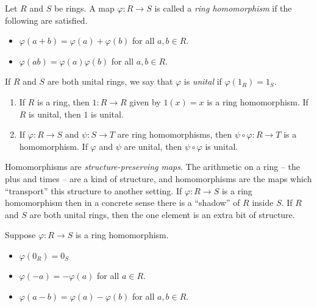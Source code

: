 \documentclass{article}
\begin{document}

\begin{dfn}
Let $R$ and $S$ be rings. A map $\varphi : R \rightarrow S$ is called a \emph{ring homomorphism} if the following are satisfied.
\begin{itemize}
\item $\varphi(a + b) = \varphi(a) + \varphi(b)$ for all $a,b \in R$.
\item $\varphi(ab) = \varphi(a)\varphi(b)$ for all $a,b \in R$.
\end{itemize}

If $R$ and $S$ are both unital rings, we say that $\varphi$ is \emph{unital} if $\varphi(1_R) = 1_S$.
\end{dfn}

\begin{prop} \mbox{}
\begin{enumerate}
\item If $R$ is a ring, then $1 : R \rightarrow R$ given by $1(x) = x$ is a ring homomorphism. If $R$ is unital, then $1$ is unital.
\item If $\varphi : R \rightarrow S$ and $\psi : S \rightarrow T$ are ring homomorphisms, then $\psi \circ \varphi : R \rightarrow T$ is a homomorphism. If $\varphi$ and $\psi$ are unital, then $\psi \circ \varphi$ is unital.
\end{enumerate}
\end{prop}

Homomorphisms are \emph{structure-preserving maps}. The arithmetic on a ring -- the plus and times -- are a kind of structure, and homomorphisms are the maps which ``transport'' this structure to another setting. If $\varphi : R \rightarrow S$ is a ring homomorphism then in a concrete sense there is a ``shadow'' of $R$ inside $S$. If $R$ and $S$ are both unital rings, then the one element is an extra bit of structure.

\begin{prop}
Suppose $\varphi : R \rightarrow S$ is a ring homomorphism.
\begin{itemize}
\item $\varphi(0_R) = 0_S$
\item $\varphi(-a) = -\varphi(a)$ for all $a \in R$.
\item $\varphi(a-b) = \varphi(a) - \varphi(b)$ for all $a,b \in R$.
\end{itemize}
\end{prop}
\end{document}
